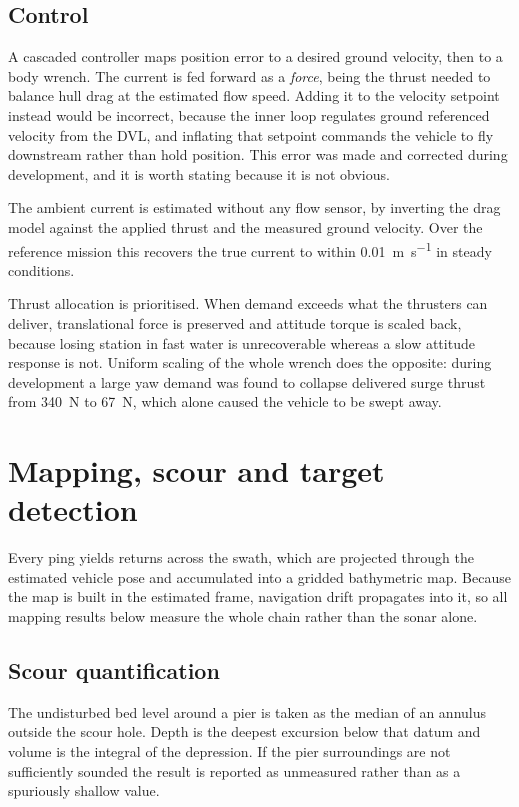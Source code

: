 \documentclass[10pt,a4paper]{article}
\begin{document}
\subsection{Control}

A cascaded controller maps position error to a desired ground velocity, then
to a body wrench. The current is fed forward as a \emph{force}, being the
thrust needed to balance hull drag at the estimated flow speed. Adding it to
the velocity setpoint instead would be incorrect, because the inner loop
regulates ground referenced velocity from the DVL, and inflating that setpoint
commands the vehicle to fly downstream rather than hold position. This error
was made and corrected during development, and it is worth stating because it
is not obvious.

The ambient current is estimated without any flow sensor, by inverting the
drag model against the applied thrust and the measured ground velocity. Over
the reference mission this recovers the true current to within
\SI{0.01}{\metre\per\second} in steady conditions.

Thrust allocation is prioritised. When demand exceeds what the thrusters can
deliver, translational force is preserved and attitude torque is scaled back,
because losing station in fast water is unrecoverable whereas a slow attitude
response is not. Uniform scaling of the whole wrench does the opposite: during
development a large yaw demand was found to collapse delivered surge thrust
from \SI{340}{\newton} to \SI{67}{\newton}, which alone caused the vehicle to
be swept away.

\section{Mapping, scour and target detection}

Every ping yields returns across the swath, which are projected through the
estimated vehicle pose and accumulated into a gridded bathymetric map. Because
the map is built in the estimated frame, navigation drift propagates into it,
so all mapping results below measure the whole chain rather than the sonar
alone.

\subsection{Scour quantification}

The undisturbed bed level around a pier is taken as the median of an annulus
outside the scour hole. Depth is the deepest excursion below that datum and
volume is the integral of the depression. If the pier surroundings are not
sufficiently sounded the result is reported as unmeasured rather than as a
spuriously shallow value.
\end{document}

